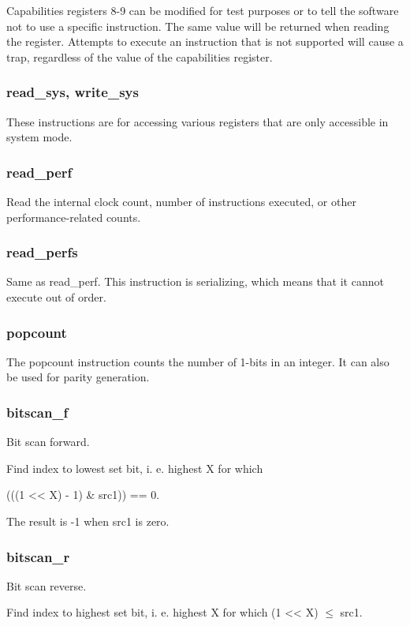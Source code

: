 \documentclass[forwardcom.tex]{subfiles}
\begin{document}
Capabilities registers 8-9 can be modified for test purposes or to tell the software not to use a specific instruction. The same value will be returned when reading the register. Attempts to execute an instruction that is not supported will cause a trap, regardless of the value of the capabilities register.

\subsubsection{read\_sys, write\_sys}
These instructions are for accessing various registers that are only accessible in system mode.

\subsubsection{read\_perf}
Read the internal clock count, number of instructions executed, or other performance-related counts.

\subsubsection{read\_perfs}
Same as read\_perf. This instruction is serializing, which means that it cannot execute out of order.

\subsubsection{popcount}
The popcount instruction counts the number of 1-bits in an integer. It can also be used for parity generation.

\subsubsection{bitscan\_f}
Bit scan forward. 
\vspace{2mm}

Find index to lowest set bit, i. e. highest X for which 

(((1 \textless\textless{} X) - 1) \& src1)) == 0.

The result is -1 when src1 is zero.

\subsubsection{bitscan\_r}
Bit scan reverse. 

Find index to highest set bit, i. e. highest X for which (1 \textless\textless{} X) $\leq$ src1.
\end{document}
